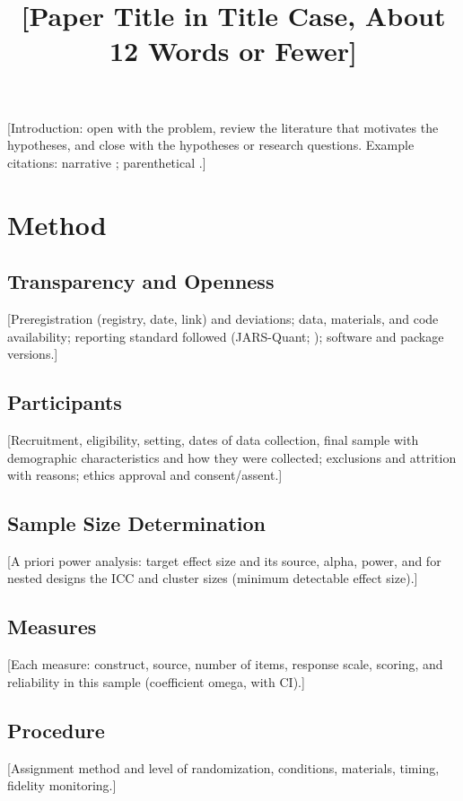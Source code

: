 \documentclass[man,floatsintext]{apa7}
\title{[Paper Title in Title Case, About 12 Words or Fewer]}
\begin{document}
\maketitle

% 
[Introduction: open with the problem, review the literature that motivates the
hypotheses, and close with the hypotheses or research questions. Example
citations: narrative \textcite{Simmons2011_false_positive}; parenthetical
\parencite{Appelbaum2018_jars_quant}.]

\section{Method}
\label{sec:method}
% 

\subsection{Transparency and Openness}
[Preregistration (registry, date, link) and deviations; data, materials, and code
availability; reporting standard followed (JARS-Quant;
\cite{Appelbaum2018_jars_quant}); software and package versions.]

\subsection{Participants}
[Recruitment, eligibility, setting, dates of data collection, final sample with
demographic characteristics and how they were collected; exclusions and
attrition with reasons; ethics approval and consent/assent.]

\subsection{Sample Size Determination}
[A priori power analysis: target effect size and its source, alpha, power, and
for nested designs the ICC and cluster sizes (minimum detectable effect size).]

\subsection{Measures}
[Each measure: construct, source, number of items, response scale, scoring, and
reliability in this sample (coefficient omega, with CI).]

\subsection{Procedure}
[Assignment method and level of randomization, conditions, materials, timing,
fidelity monitoring.]
\end{document}
